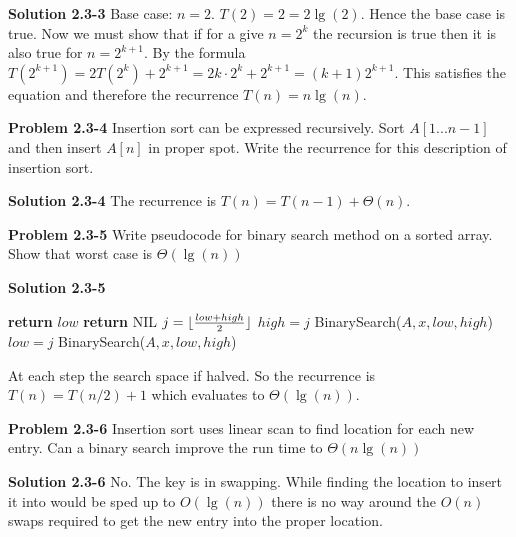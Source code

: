 \documentclass{article}
\DeclarePairedDelimiter\floor{\lfloor}{\rfloor}
\begin{document}
\medskip

\textbf{Solution 2.3-3} Base case: $n = 2$. $T(2) = 2 = 2\lg(2)$. Hence the base case is true. Now we must show that if for a give $n = 2^k$ the recursion is true then it is also true for $n = 2^{k+1}$. By the formula $T(2^{k+1}) = 2T(2^{k}) + 2^{k+1} = 2k \cdot 2^{k} + 2^{k+1} = (k+1)2^{k+1}$. This satisfies the equation and therefore the recurrence $T(n) = n\lg(n)$.

\hrulefill

\medskip

\textbf{Problem 2.3-4} Insertion sort can be expressed recursively. Sort $A[1...n-1]$ and then insert $A[n]$ in proper spot. Write the recurrence for this description of insertion sort.

\medskip

\textbf{Solution 2.3-4} The recurrence is $T(n) = T(n-1) + \Theta(n)$.

\hrulefill

\medskip

\textbf{Problem 2.3-5} Write pseudocode for binary search method on a sorted array. Show that worst case is $\Theta(\lg(n))$

\medskip

\textbf{Solution 2.3-5}

\begin{algorithm}
\begin{algorithmic}[1]
		\State \textbf{return} $low$
	\Else
		\State \textbf{return} NIL
	\EndIf
\EndIf
\State $j = \floor{\frac{low+high}{2}}$
	\State $high = j$
	\State BinarySearch($A,x,low,high$)
\Else
	\State $low = j$
	\State BinarySearch($A,x,low,high$)
\EndIf
\EndProcedure
\end{algorithmic}
\end{algorithm}

At each step the search space if halved. So the recurrence is $T(n) = T(n/2) + 1$ which evaluates to $\Theta(\lg(n))$.

\hrulefill

\medskip

\textbf{Problem 2.3-6} Insertion sort uses linear scan to find location for each new entry. Can a binary search improve the run time to $\Theta(n\lg(n))$

\medskip

\textbf{Solution 2.3-6} No. The key is in swapping. While finding the location to insert it into would be sped up to $O(\lg(n))$ there is no way around the $O(n)$ swaps required to get the new entry into the proper location.
\end{document}
